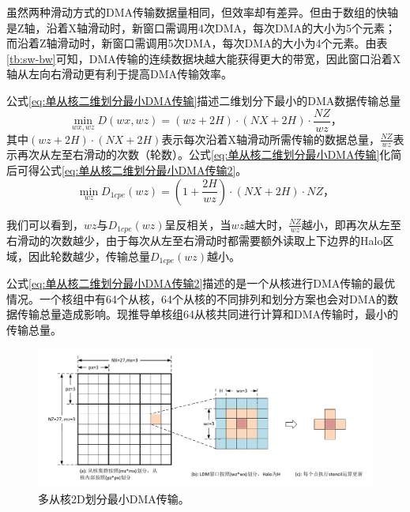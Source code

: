 \documentclass[degree=doctor]{thuthesis}
\begin{document}
虽然两种滑动方式的DMA传输数据量相同，但效率却有差异。但由于数组的快轴是Z轴，沿着X轴滑动时，新窗口需调用4次DMA，每次DMA的大小为5个元素；而沿着Z轴滑动时，新窗口需调用5次DMA，每次DMA的大小为4个元素。由表\ref{tb:sw-bw}可知，DMA传输的连续数据块越大能获得更大的带宽，因此窗口沿着X轴从左向右滑动更有利于提高DMA传输效率。

公式\ref{eq:单从核二维划分最小DMA传输}描述二维划分下最小的DMA数据传输总量
\begin{equation}
  \min_{wx,wz} D(wx,wz) = (wz+2H)\cdot(NX+2H)\cdot\frac{NZ}{wz}，
  \label{eq:单从核二维划分最小DMA传输}
\end{equation}
其中$(wz+2H)\cdot(NX+2H)$表示每次沿着X轴滑动所需传输的数据总量，$\frac{NZ}{wz}$表示再次从左至右滑动的次数（轮数）。公式\ref{eq:单从核二维划分最小DMA传输}化简后可得公式\ref{eq:单从核二维划分最小DMA传输2}。
\begin{equation}
  \min_{wz} D_{1cpe}(wz) = (1+\frac{2H}{wz})\cdot(NX+2H)\cdot NZ，
  \label{eq:单从核二维划分最小DMA传输2}
\end{equation}

我们可以看到，$wz$与$D_{1cpe}(wz)$呈反相关，当$wz$越大时，$\frac{NZ}{wz}$越小，即再次从左至右滑动的次数越少，由于每次从左至右滑动时都需要额外读取上下边界的Halo区域，因此轮数越少，传输总量$D_{1cpe}(wz)$越小。

公式\ref{eq:单从核二维划分最小DMA传输2}描述的是一个从核进行DMA传输的最优情况。一个核组中有64个从核，64个从核的不同排列和划分方案也会对DMA的数据传输总量造成影响。现推导单核组64从核共同进行计算和DMA传输时，最小的传输总量。

\begin{figure}[ht]
  \centering
  \includegraphics[width=1.0\columnwidth]{多从核2D划分最小DMA传输.pdf}
  \caption{多从核2D划分最小DMA传输。}
  \label{fig:multi-cpe-2d-derive}
\end{figure}
\end{document}
